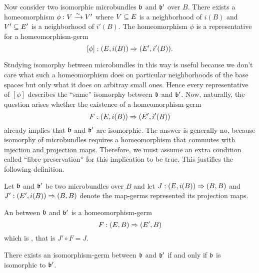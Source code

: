 \begin{myparagraph}
    Now consider two isomorphic microbundles $\mathfrak{b}$ and $\mathfrak{b}'$ over $B$.
    There exists a homeomorphism $\phi: V \xrightarrow{\sim} V'$ where $V \subseteq{} E$ is a neighborhood of $i(B)$ and $V' \subseteq{} E'$ is a neighborhood of $i'(B)$.
    The homeomorphism $\phi$ is a representative for a homeomorphism-germ
    \[ [\phi]: (E, i(B)) \Rightarrow (E', i'(B)). \]

    Studying isomorphy between microbundles in this way is useful because we don't care what such a
    homeomorphism does on particular neighborhoods of the base spaces but only what it does on arbitray small ones.
    Hence every representative of $[\phi]$ describes the ``same'' isomorphy between $\mathfrak{b}$ and $\mathfrak{b}'$.
    Now, naturally, the question arises whether the existence of a homeomorphism-germ
    \[ F: (E, i(B)) \Rightarrow (E', i'(B)) \]
    already implies that $\mathfrak{b}$ and $\mathfrak{b}'$ are isomorphic.
    The answer is generally no, because isomorphy of microbundles requires 
    a homeomorphism that \ul{commutes with injection and projection maps}.
    Therefore, we must assume an extra condition called ``fibre-preservation'' for this implication to be true.
    This justifies the following definition.
    
    Let $\mathfrak{b}$ and $\mathfrak{b}'$ be two microbundles over $B$ and
    let $J: (E, i(B)) \Rightarrow (B, B)$ and $J': (E', i(B)) \Rightarrow (B, B)$ denote the map-germs represented its projection maps.
\end{myparagraph}

\begin{mydefinition}
    An  between $\mathfrak{b}$ and $\mathfrak{b}'$ is a homeomorphism-germ 
    \[ F: (E, B) \Rightarrow (E', B) \]
    which is , that is $J' \circ F = J$.
\end{mydefinition}

\begin{myremark}
    There exists an isomorphism-germ between $\mathfrak{b}$ and $\mathfrak{b}'$ if and only if $\mathfrak{b}$ is isomorphic to $\mathfrak{b}'$.
\end{myremark}